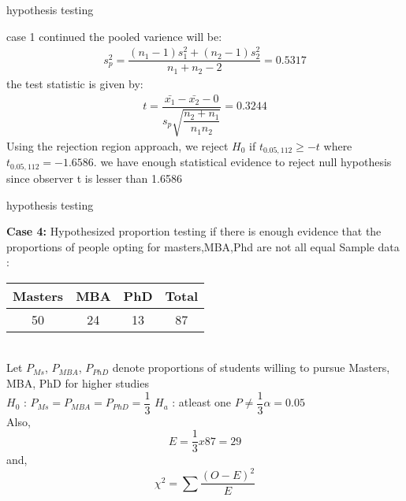 \documentclass{beamer}
\begin{document}
    \begin{frame}{hypothesis testing}
    \begin{block}{case 1 continued}
        the pooled varience will be:
           \begin{align}
               s^2_p=\dfrac{(n_1-1)s^2_1+(n_2-1)s^2_2}{n_1+n_2-2}=0.5317
           \end{align}
           the test statistic is given by:
           \begin{align}
               t=\dfrac{\bar{x_1}-\bar{x_2}-0}{s_p\sqrt{\dfrac{n_2+n_1}{n_1n_2}}}=0.3244
           \end{align}
           Using the rejection region approach, we reject $H_0$ if $t_{0.05,112}\geq -t$ where $t_{0.05,112}=-1.6586$. we have enough statistical evidence to reject null hypothesis since observer t is lesser than 1.6586
           
    \end{block}
        
    \end{frame}
    \begin{frame}{hypothesis testing}
    
  \begin{block}{\textbf{Case 4:} Hypothesized proportion testing if there is enough evidence that the proportions of people opting for masters,MBA,Phd are not all equal}
    Sample data :
    \begin{tabular}{|c|c|c|c|}
        \hline
        Masters & MBA & PhD & Total\\
        \hline
        50 & 24 & 13 & 87 \\
        \hline
    \end{tabular}\\

    Let $P_{Ms}$, $P_{MBA}$, $P_{PhD}$ denote proportions of students willing to pursue Masters, MBA, PhD for higher studies \\

    $H_{0}$ :  $P_{Ms} = P_{MBA} = P_{PhD} = \dfrac{1}{3}$ \space \space \space \space $H_{a}$ : atleast one $P \neq \dfrac{1}{3}$\space \space \space \space $\alpha =0.05$\\

    Also,
    \begin{equation}
        E = \dfrac{1}{3} x 87 = 29
    \end{equation}
    and,
    \begin{equation}
        \chi^{2} = \sum\dfrac{(O - E)^{2}}{E}
    \end{equation}  
    \end{block}
\end{frame}
\end{document}
